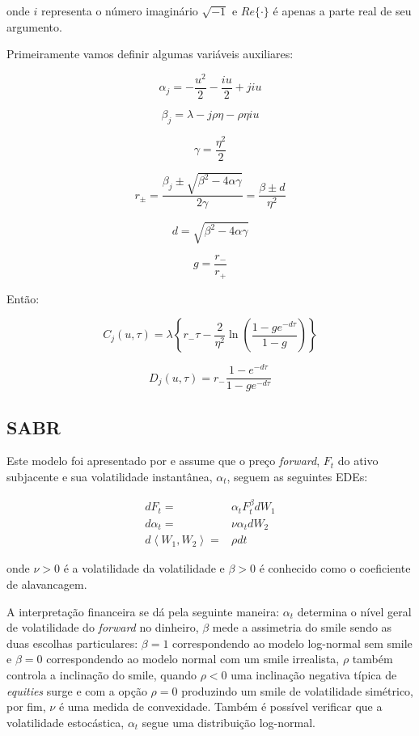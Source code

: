 \documentclass[]{book}
\theoremstyle{definition}
\theoremstyle{definition}
\theoremstyle{definition}
\theoremstyle{remark}
\begin{document}
onde \(i\) representa o número imaginário \(\sqrt{-1}\) e \(Re\{\cdot\}\) é apenas a parte real de seu argumento.

Primeiramente vamos definir algumas variáveis auxiliares:

\[\alpha_j=-\frac{u^2}{2}-\frac{iu}{2}+jiu\]

\[\beta_j=\lambda-j\rho\eta-\rho\eta i u\]

\[\gamma=\frac{\eta^2}{2}\]

\[r_{\pm}=\frac{\beta_j\pm\sqrt{\beta^2-4\alpha\gamma}}{2\gamma}=\frac{\beta\pm d}{\eta^2}\]

\[d=\sqrt{\beta^2-4\alpha\gamma}\]

\[g=\frac{r_-}{r_+}\]

Então:

\[C_j(u, \tau)=\lambda\left\lbrace  r_-\tau-\frac{2}{\eta^2}\ln\left(\frac{1-ge^{-d\tau}}{1-g}\right) \right\rbrace
\label{eq:cj}\]

\[D_j(u, \tau)=r_-\frac{1-e^{-d\tau}}{1-ge^{-d\tau}}
\label{eq:dj}\]

\hypertarget{sabr}{%
\subsection{SABR}\label{sabr}}

Este modelo foi apresentado por \citet{Hagan2002} e assume que o preço \emph{forward}, \(F_t\) do ativo subjacente e sua volatilidade instantânea, \(\alpha_t\), seguem as seguintes EDEs:

\[
\begin{aligned}
dF_t=&\alpha_tF_t^\beta dW_1\\
d\alpha_t=&\nu\alpha_t dW_2\\
d\left\langle W_1, W_2 \right\rangle =&\rho dt
\end{aligned}
\label{eq:sabr}
\]

onde \(\nu > 0\) é a volatilidade da volatilidade e \(\beta > 0\) é conhecido como o coeficiente de alavancagem.

A interpretação financeira se dá pela seguinte maneira: \(\alpha_t\) determina o nível geral de volatilidade do \emph{forward} no dinheiro, \(\beta\) mede a assimetria do smile sendo as duas escolhas particulares: \(\beta = 1\) correspondendo ao modelo log-normal sem smile e \(\beta = 0\) correspondendo ao modelo normal com um smile irrealista, \(\rho\) também controla a inclinação do smile, quando \(\rho < 0\) uma inclinação negativa típica de \emph{equities} surge e com a opção \(\rho = 0\) produzindo um smile de volatilidade simétrico, por fim, \(\nu\) é uma medida de convexidade. Também é possível verificar que a volatilidade estocástica, \(\alpha_t\) segue uma distribuição log-normal.
\end{document}
